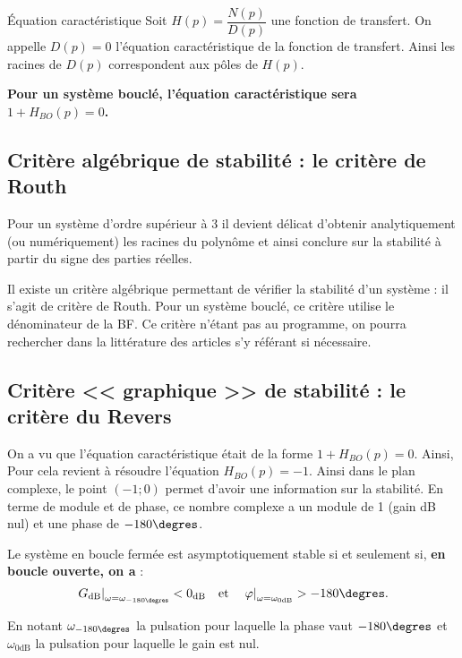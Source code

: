 \begin{defi}{Équation caractéristique}
Soit $H(p)=\dfrac{N(p)}{D(p)}$ une fonction de transfert. On appelle $D(p)=0$ l'équation caractéristique de la fonction de transfert. Ainsi les racines de $D(p)$ correspondent aux pôles de $H(p)$.
\end{defi}

\textbf{Pour un système bouclé, l'équation caractéristique sera $1+H_{BO}(p)=0$.}

\subsection{Critère algébrique de stabilité : le critère de Routh}
Pour un système d'ordre supérieur à 3 il devient délicat d'obtenir analytiquement (ou numériquement) les racines du polynôme et ainsi conclure sur la stabilité à partir du signe des parties réelles. 

Il existe un critère algébrique permettant de vérifier la stabilité d'un système : il s'agit de critère de Routh. Pour un système bouclé, ce critère utilise le dénominateur de la BF. Ce critère n'étant pas au programme, on pourra rechercher dans la littérature des articles s'y référant si nécessaire. 

\subsection{Critère << graphique >> de stabilité : le critère du Revers}
 On a vu que l'équation caractéristique était de la forme $1+H_{BO}(p)=0$. Ainsi, Pour cela revient à résoudre l'équation $H_{BO}(p)=-1$. Ainsi dans le plan complexe, le point $(-1;0)$ permet d'avoir une information sur la stabilité. En terme de module et de phase, ce nombre complexe a un module de 1 (gain dB nul) et une phase de $-180\degres$.
 
\begin{resultat}
Le système en boucle fermée est asymptotiquement stable si et seulement si, \textbf{en boucle ouverte, on a} :
$$
\left. G_{\text{dB}} \right|_{\omega=\omega_{-180\degres}}<0_{\text{dB}} 
\quad
\text{et}
\quad
\left. \varphi \right|_{\omega=\omega_{0\text{dB}}}>-180\degres.
$$

En notant $\omega_{-180\degres}$ la pulsation pour laquelle la phase vaut $-180\degres$ et $\omega_{0\text{dB}}$ la pulsation pour laquelle le gain est nul.
\end{resultat}
 
